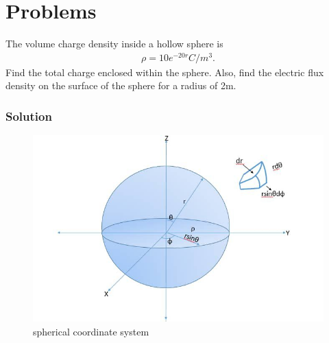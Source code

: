\section{Problems}
\begin{exmp}
	The volume charge density inside a hollow sphere is 
	\begin{align*}
			\rho=10e^{-20r} C/m^{3}.
		\end{align*}
	Find the total charge enclosed within the sphere. Also, find the electric flux density on the surface of the sphere for a radius of 2m.
	
	\subsubsection*{Solution}
	\begin{figure}[h]
			\centering
			\includegraphics[width=1\linewidth]{graphics/circleBobo}
			\caption{spherical coordinate system}
		\end{figure} 
	

\end{exmp}
